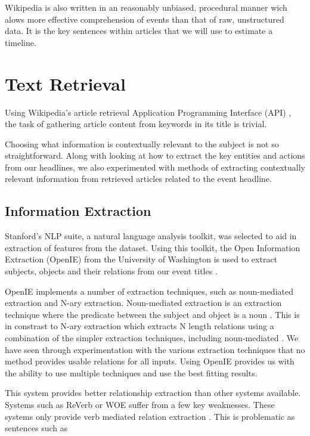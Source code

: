 \documentclass[bsc,frontabs,twoside,singlespacing,parskip,deptreport]{infthesis}     %
\begin{document}
Wikipedia is also written in an reasonably unbiased, procedural manner wich alows more effective comprehension of events
than that of raw, unstructured data.
It is the key sentences within articles that we will use to estimate a timeline.

\section{Text Retrieval}
Using Wikipedia's article retrieval Application Programming Interface (API) \cite{wikipediaAPI}, the task of gathering article content
from keywords in its title is trivial.

Choosing what information is contextually relevant to the subject is not so straightforward.
Along with looking at how to extract the key entities and actions from our 
headlines, we also experimented with methods of extracting contextually relevant information from
retrieved articles related to the event headline.

\subsection{Information Extraction}
Stanford's NLP suite,
a natural language analysis toolkit,
was selected to aid in extraction of features from the dataset.
Using this toolkit, the Open Information Extraction (OpenIE) from
the University of Washington is used to extract subjects, objects
and their relations from our event titles \cite{schmitz2012open}.


OpenIE implements a number of extraction techniques, such as noun-mediated extraction and N-ary extraction.
Noun-mediated extraction is an extraction technique where the predicate between the subject and object is a noun \cite{mirrezaei2015triplex}.
This is in constrast to N-ary extraction which extracts N length relations using a combination of the simpler extraction techniques, including noun-mediated \cite{akbik2012kraken}. 
We have seen through experimentation with the various extraction techniques that no  method provides
usable relations for all inputs. Using OpenIE provides us with the ability to use multiple techniques and
use the best fitting results.

This system provides better relationship extraction than other systems available. Systems such as
ReVerb\cite{fader2011identifying} or WOE\cite{wu2010open} suffer from a few key weaknesses. These systems only provide verb mediated relation extraction \cite{schmitz2012open}. This is problematic as sentences such as
\end{document}
